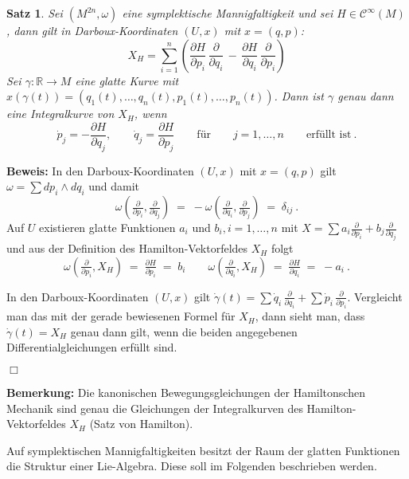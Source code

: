 \documentclass[12pt,a4paper]{article}
\def\R{\mathbb{R}}
\newtheorem{Satz}[Lemma]{Satz}
\def\proof{\noindent\textbf{Beweis:}\quad}
\def\qed{\quad\hfill\ensuremath{\Box}}
\begin{document}
\bigskip

\begin{Satz}
Sei $(M^{2n}, \omega)$ eine symplektische Mannigfaltigkeit und sei $H \in \mathcal C^\infty(M)$,
dann gilt in Darboux-Koordinaten $(U,x)$ mit $x=(q,p)$:
$$
X_H  = \sum^n_{i=1} \left(
 \frac{\partial H}{\partial p_i} \, \frac{\partial }{\partial q_i} \, -
 \,\frac{\partial H}{\partial q_i} \,\frac{\partial }{\partial p_i}
\right)
$$
Sei $\gamma : \R \rightarrow M$ eine glatte Kurve mit
$x(\gamma(t))=(q_1(t), \ldots, q_n(t),p_1(t),\ldots, p_n(t))$. Dann ist $\gamma$
genau dann eine Integralkurve von $X_H$, wenn
$$
\dot p_j = - \frac{\partial H}{\partial q_j }, \qquad
\dot q_j = \frac{\partial H}{\partial p_j }
\qquad \mbox{f\"ur} \qquad j = 1, \ldots, n \qquad \mbox{erf\"ullt ist}\ .
$$
\end{Satz}
\proof
In den Darboux-Koordinaten $(U,x)$ mit $x=(q,p)$ gilt $\omega = \sum dp_i \wedge dq_i$ und damit
$$
\omega( \tfrac{\partial }{\partial p_i },  \tfrac{\partial }{\partial q_j }) \;= \;
- \omega( \tfrac{\partial }{\partial q_i },  \tfrac{\partial }{\partial p_j })
\; = \;
\delta_{ij} \ .
$$
Auf $U$ existieren glatte Funktionen $a_i$ und $b_i, i= 1,\ldots, n$ mit
$
X = \sum a_i \tfrac{\partial }{\partial p_i } + b_j \tfrac{\partial }{\partial q_j }
$
und aus der Definition des Hamilton-Vektorfeldes $X_H$ folgt
$$
\omega(\tfrac{\partial }{\partial p_i }, X_H) \;=\; \tfrac{\partial H}{\partial p_i } \;=\; b_i
\qquad
\omega(\tfrac{\partial }{\partial q_i }, X_H) \;=\; \tfrac{\partial H}{\partial q_i } \;=\; - a_i \ .
$$

In den Darboux-Koordinaten $(U,x)$ gilt
$
\dot \gamma (t) = \sum \dot q_i \, \tfrac{\partial }{\partial q_i } + \sum \dot p_i\, \tfrac{\partial }{\partial p_i }.
$
Vergleicht man das mit der gerade bewiesenen Formel f\"ur $X_H$, dann sieht man, dass  $\dot \gamma (t) = X_H$ genau dann
gilt, wenn die beiden angegebenen Differentialgleichungen erf\"ullt sind.

\qed

\bigskip

{\bf Bemerkung:}
Die kanonischen Bewegungsgleichungen der Hamiltonschen Mechanik sind genau die Gleichungen der
Integralkurven des Hamilton-Vektorfeldes $X_H$ (Satz von Hamilton).

\bigskip

Auf symplektischen Mannigfaltigkeiten besitzt der Raum der glatten Funktionen die Struktur
einer Lie-Algebra. Diese soll im Folgenden beschrieben werden.

\medskip
\end{document}
